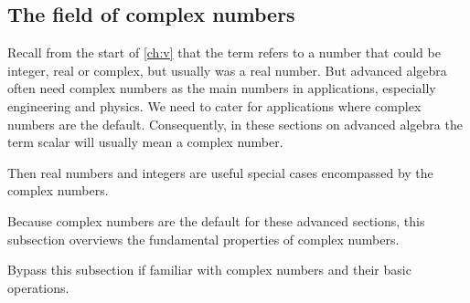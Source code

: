\begin{draft}
%
%
%
%
%
%
%
%

\subsection{The field of complex numbers}
\label{sec:fcn}

Recall from the start of \autoref{ch:v} that the term  refers to a number that could be integer, real or complex, but usually was a real number.
But advanced algebra often need complex numbers as the main numbers in applications, especially engineering and physics. 
We need to cater for applications where complex numbers are the default.
Consequently, in these sections on advanced algebra the term scalar will usually mean a complex number.

Then real numbers and integers are useful special cases encompassed by the complex numbers.

Because complex numbers are the default for these advanced sections, this subsection overviews the fundamental properties of complex numbers.
\begin{aside}
Bypass this subsection if familiar with complex numbers and their basic operations.
\end{aside}


\end{draft}
